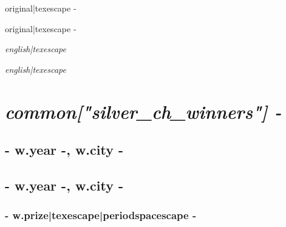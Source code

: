 {%

{%
{%
{\large {{ original|texescape -}} } 
{%
{%
\begin{addmargin}[-0.05em]{0em}{\large {{ original|texescape -}} }\end{addmargin}{\itshape {{ english|texescape }} }
{%
\begin{addmargin}[-0.05em]{0em}{\large{ } }\end{addmargin}{\itshape {{ english|texescape }} }
{%
{\large{} } 
{%
{%
{%

{%
{%
{%
{%
{%
{%
{%
{%
{%
{%

{%
\chapter*{\hfill{\slshape {{ common["silver_ch_winners"] -}} } }
\thispagestyle{empty}
\vspace{70pt}
{%
{%
    \section*{ {{- w.year -}}, {{ w.city -}} }
{%
    \section*{ {{- w.year -}}, {{ w.city -}} }
{%
{%
    {%
        \subsection*{ {{- w.prize|texescape|periodspacescape -}} }
    {%
}}}}}}}}}}}}}}}}}}}}}}}}}}}}
